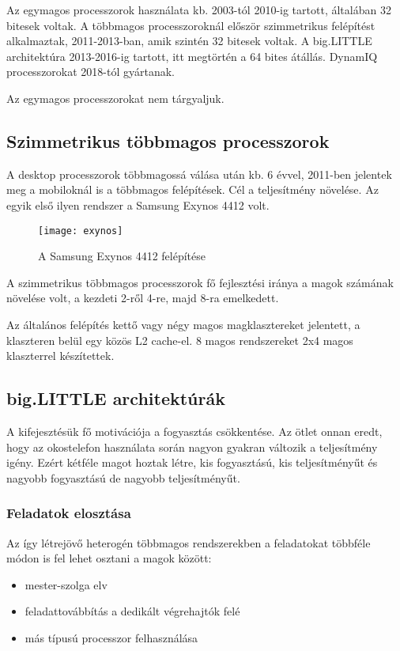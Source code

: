 Az egymagos processzorok használata kb. 2003-tól 2010-ig tartott, általában 32 bitesek voltak.
A többmagos processzoroknál először szimmetrikus felépítést alkalmaztak, 2011-2013-ban, amik szintén 32 bitesek voltak.
A big.LITTLE architektúra 2013-2016-ig tartott, itt megtörtén a 64 bites átállás.
DynamIQ processzorokat 2018-tól gyártanak.

Az egymagos processzorokat nem tárgyaljuk.

\subsection{Szimmetrikus többmagos processzorok}
A desktop processzorok többmagossá válása után kb. 6 évvel, 2011-ben jelentek meg a mobiloknál is a többmagos felépítések.
Cél a teljesítmény növelése.
Az egyik első ilyen rendszer a Samsung Exynos 4412 volt.
\begin{figure}[H]
    \texttt{[image: exynos]}
    \centering
    \caption{A Samsung Exynos 4412 felépítése}
    \label{fig:exynos}
\end{figure}
A szimmetrikus többmagos processzorok fő fejlesztési iránya a magok számának növelése volt, a kezdeti 2-ről 4-re, majd 8-ra emelkedett.

Az általános felépítés kettő vagy négy magos magklasztereket jelentett, a klaszteren belül egy közös L2 cache-el.
8 magos rendszereket 2x4 magos klaszterrel készítettek.

\subsection{big.LITTLE architektúrák}
A kifejesztésük fő motivációja a fogyasztás csökkentése.
Az ötlet onnan eredt, hogy az okostelefon használata során nagyon gyakran változik a teljesítmény igény.
Ezért kétféle magot hoztak létre, kis fogyasztású, kis teljesítményűt és nagyobb fogyasztású de nagyobb teljesítményűt.

\subsubsection{Feladatok elosztása}
Az így létrejövő heterogén többmagos rendszerekben a feladatokat többféle módon is fel lehet osztani a magok között:
\begin{itemize}
    \item mester-szolga elv
    \item feladattovábbítás a dedikált végrehajtók felé
    \item más típusú processzor felhasználása
\end{itemize} 

